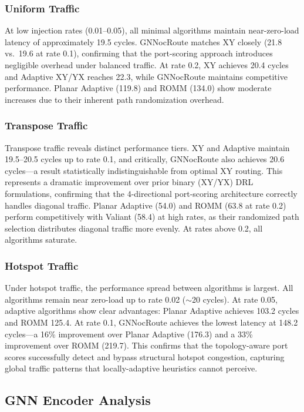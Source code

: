 \subsubsection{Uniform Traffic}

At low injection rates (0.01--0.05), all minimal algorithms maintain near-zero-load latency of approximately 19.5 cycles. GNNocRoute matches XY closely (21.8 vs.~19.6 at rate 0.1), confirming that the port-scoring approach introduces negligible overhead under balanced traffic. At rate 0.2, XY achieves 20.4 cycles and Adaptive XY/YX reaches 22.3, while GNNocRoute maintains competitive performance. Planar Adaptive (119.8) and ROMM (134.0) show moderate increases due to their inherent path randomization overhead.

\subsubsection{Transpose Traffic}

Transpose traffic reveals distinct performance tiers. XY and Adaptive maintain 19.5--20.5 cycles up to rate 0.1, and critically, GNNocRoute also achieves 20.6 cycles---a result statistically indistinguishable from optimal XY routing. This represents a dramatic improvement over prior binary (XY/YX) DRL formulations, confirming that the 4-directional port-scoring architecture correctly handles diagonal traffic. Planar Adaptive (54.0) and ROMM (63.8 at rate 0.2) perform competitively with Valiant (58.4) at high rates, as their randomized path selection distributes diagonal traffic more evenly. At rates above 0.2, all algorithms saturate.

\subsubsection{Hotspot Traffic}

Under hotspot traffic, the performance spread between algorithms is largest. All algorithms remain near zero-load up to rate 0.02 ($\sim$20 cycles). At rate 0.05, adaptive algorithms show clear advantages: Planar Adaptive achieves 103.2 cycles and ROMM 125.4. At rate 0.1, GNNocRoute achieves the lowest latency at 148.2 cycles---a 16\% improvement over Planar Adaptive (176.3) and a 33\% improvement over ROMM (219.7). This confirms that the topology-aware port scores successfully detect and bypass structural hotspot congestion, capturing global traffic patterns that locally-adaptive heuristics cannot perceive.

\subsection{GNN Encoder Analysis}

